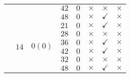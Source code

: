 \documentclass[12pt,a4paper,halfparskip,headsepline,bibtotocnumbered]{scrreprt}
\theoremstyle{nummermitklammern}
\theoremstyle{nonumberbreak}
\begin{document}
\begin{table}[H]
\begin{tabular}{|c|c|c|c|c|c|c|c|}
								&						&							&$42$	&$0$	&$\times$		&$\times$		&$\times$\\ \cline{4-8}
								&						&							&$48$	&$0$	&$\times$		&$\checkmark$	&$\times$\\ \cline{2-8}
								&\multirow{6}{*}{$14$}	&\multirow{6}{*}{$0(0)$}	&$21$	&$0$	&$\times$		&$\checkmark$	&$\times$\\ \cline{4-8}
								&						&							&$28$	&$0$	&$\times$		&$\times$		&$\times$\\ \cline{4-8}
								&						&							&$36$	&$0$	&$\times$		&$\checkmark$	&$\times$\\ \cline{4-8}
								&						&							&$42$	&$0$	&$\times$		&$\checkmark$	&$\times$\\ \cline{4-8}
								&						&							&$32$	&$0$	&$\times$		&$\times$		&$\times$\\ \cline{4-8}
								&						&							&$48$	&$0$	&$\times$		&$\checkmark$	&$\times$\\ \hline
	\end{tabular}
\end{table}
\end{document}
